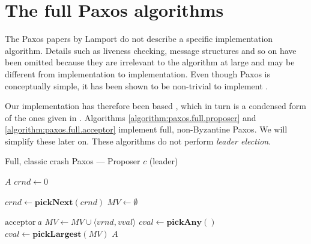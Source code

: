 \section{The full Paxos algorithms}

The Paxos papers by Lamport \cite{Lamport:1998:PP:279227.279229,Lam01}
do not describe a specific implementation algorithm.
Details such as liveness checking, message structures and so on have
been omitted because they are irrelevant to the algorithm at large and may be
different from implementation to implementation.  Even though Paxos
is conceptually simple, it has been shown to be non-trivial to implement
\cite{Chandra:2007:PML:1281100.1281103}.

Our implementation has therefore been based 
\cite{Insane.Paxos}, which in turn is a condensed form of the ones given in 
\cite{renesse.paxos,Lam01}.
%
Algorithms \ref{algorithm:paxos.full.proposer} and
\ref{algorithm:paxos.full.acceptor} implement full, non-Byzantine Paxos.
We will simplify these later on.  These algorithms do not perform \textit{leader
election}.

\begin{algorithm}
  \caption{Full, classic crash Paxos --- Proposer $c$ (leader)}
  \label{algorithm:paxos.full.proposer}
  \begin{algorithmic}

    \State $A$ 
    \State $crnd \gets 0$ 
    \State

      \State $crnd \gets \textbf{pickNext}(crnd)$ 
      \State $MV \gets \emptyset$ 
      \State {}
    \EndOn
    \State

       {$\text{acceptor}\ a$} 
        \State $MV \gets MV \cup \langle vrnd, vval \rangle$
            \State $cval \gets \textbf{pickAny}()$ 
          \Else
            \State $cval \gets \textbf{pickLargest}(MV)$ 
          \EndIf
         \State {}
                       {$A$}
        \EndIf
      \EndIf
    \EndOn
  \end{algorithmic}
\end{algorithm}

